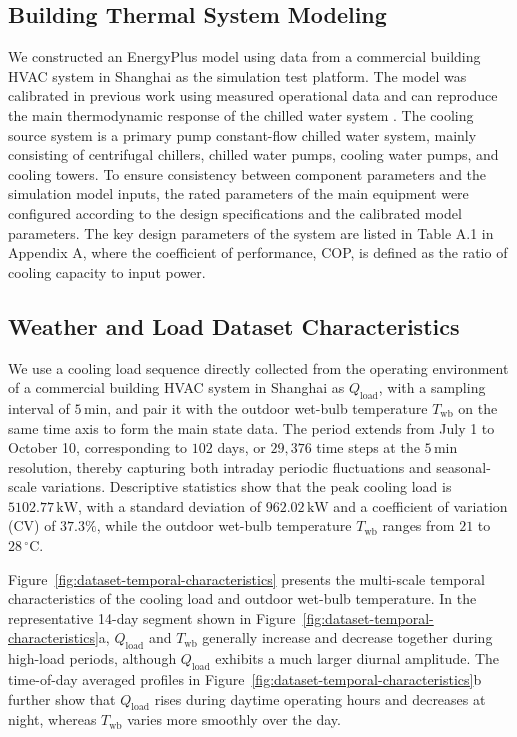 \documentclass[preprint,12pt,number]{elsarticle}
\begin{document}
\subsection{Building Thermal System Modeling}\label{building-thermal-system-modeling}

We constructed an EnergyPlus model using data from a commercial building HVAC system in Shanghai as the simulation test platform. The model was calibrated in previous work using measured operational data and can reproduce the main thermodynamic response of the chilled water system \cite{ref29}. The cooling source system is a primary pump constant-flow chilled water system, mainly consisting of centrifugal chillers, chilled water pumps, cooling water pumps, and cooling towers. To ensure consistency between component parameters and the simulation model inputs, the rated parameters of the main equipment were configured according to the design specifications and the calibrated model parameters. The key design parameters of the system are listed in Table A.1 in Appendix A, where the coefficient of performance, COP, is defined as the ratio of cooling capacity to input power.

\subsection{Weather and Load Dataset Characteristics}\label{weather-and-load-dataset-characteristics}

We use a cooling load sequence directly collected from the operating environment of a commercial building HVAC system in Shanghai as \(Q_{\mathrm{load}}\), with a sampling interval of \(5\,\mathrm{min}\), and pair it with the outdoor wet-bulb temperature \(T_{\mathrm{wb}}\) on the same time axis to form the main state data. The period extends from July 1 to October 10, corresponding to \(102\) days, or \(29,376\) time steps at the \(5\,\mathrm{min}\) resolution, thereby capturing both intraday periodic fluctuations and seasonal-scale variations. Descriptive statistics show that the peak cooling load is \(5102.77\,\mathrm{kW}\), with a standard deviation of \(962.02\,\mathrm{kW}\) and a coefficient of variation (CV) of \(37.3\%\), while the outdoor wet-bulb temperature \(T_{\mathrm{wb}}\) ranges from \(21\) to \(28\,\mathrm{^{\circ}C}\).

Figure~\ref{fig:dataset-temporal-characteristics} presents the multi-scale temporal characteristics of the cooling load and outdoor wet-bulb temperature. In the representative 14-day segment shown in Figure~\ref{fig:dataset-temporal-characteristics}a, \(Q_{\mathrm{load}}\) and \(T_{\mathrm{wb}}\) generally increase and decrease together during high-load periods, although \(Q_{\mathrm{load}}\) exhibits a much larger diurnal amplitude. The time-of-day averaged profiles in Figure~\ref{fig:dataset-temporal-characteristics}b further show that \(Q_{\mathrm{load}}\) rises during daytime operating hours and decreases at night, whereas \(T_{\mathrm{wb}}\) varies more smoothly over the day.
\end{document}
